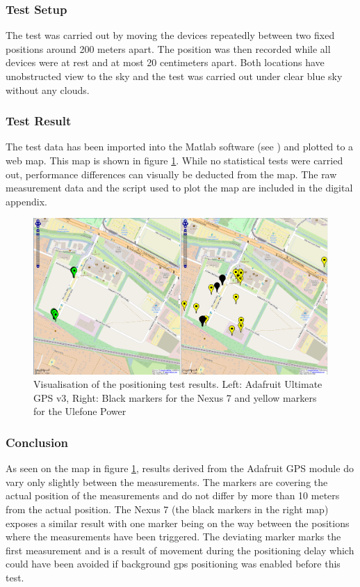 \subsubsection{Test Setup}
The test was carried out by moving the devices repeatedly between two fixed positions around 200 meters apart. The position was then recorded while all devices were at rest and at most 20 centimeters apart. Both locations have unobstructed view to the sky and the test was carried out under clear blue sky without any clouds.

\subsubsection{Test Result}
The test data has been imported into the Matlab software (see \cite{MATLAB}) and plotted to a web map. This map is shown in figure \ref{fig:gps_comparison}. While no statistical tests were carried out, performance differences can visually be deducted from the map. The raw measurement data and the script used to plot the map are included in the digital appendix.

\begin{figure}[t]
\centering
\includegraphics[width=1.0\textwidth]{src/gps_comparison.png}
\caption{Visualisation of the positioning test results. Left: Adafruit Ultimate GPS v3, Right: Black markers for the Nexus 7 and yellow markers for the Ulefone Power}
\label{fig:gps_comparison}
\end{figure}

\subsubsection{Conclusion}
As seen on the map in figure \ref{fig:gps_comparison}, results derived from the Adafruit GPS module do vary only slightly between the measurements. The markers are covering the actual position of the measurements and do not differ by more than 10 meters from the actual position. The Nexus 7 (the black markers in the right map) exposes a similar result with one marker being on the way between the positions where the measurements have been triggered. The deviating marker marks the first measurement and is a result of movement during the positioning delay which could have been avoided if background gps positioning was enabled before this test. 

